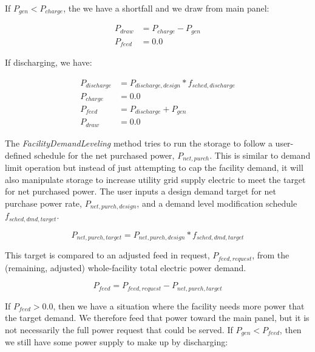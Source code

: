 If ${P_{gen}} < {P_{charge}}$, the we have a shortfall and we draw from main panel:

\begin{equation}
  \begin{array}{rl}
    {P_{draw}} &= {P_{charge}} - {P_{gen}} \\
    {P_{feed}} &= 0.0
  \end{array}
\end{equation}

If discharging, we have:

\begin{equation}
  \begin{array}{rl}
    {P_{discharge}} &= {P_{discharge,design}} * {f_{sched,discharge}} \\
    {P_{charge}} &= 0.0 \\
    {P_{feed}} &= {P_{discharge}} + {P_{gen}} \\
    {P_{draw}} &= 0.0
  \end{array}
\end{equation}

The \emph{FacilityDemandLeveling} method tries to run the storage to follow a user-defined schedule for the net purchased power, ${P_{net,purch}}$.  This is similar to demand limit operation but instead of just attempting to cap the facility demand, it will also manipulate storage to increase utility grid supply electric to meet the target for net purchased power.  The user inputs a design demand target for net purchase power rate, ${P_{net,purch,design}} $, and a demand level modification schedule ${f_{sched,dmd,target}}$.

\begin{equation}
  {P_{net,purch,target}} = {P_{net,purch,design}} *{f_{sched,dmd,target}}
\end{equation}

This target is compared to an adjusted feed in request, ${P_{feed, request}}$, from the (remaining, adjusted) whole-facility total electric power demand.

\begin{equation}
  {P_{feed}} = {P_{feed,request}} - {P_{net,purch,target}}
\end{equation}

If ${P_{feed}} > 0.0$, then we have a situation where the facility needs more power that the target demand.  We therefore feed that power toward the main panel, but it is not necessarily the full power request that could be served.  If ${P_{gen}} < {P_{feed}}$, then we still have some power supply to make up by discharging:

